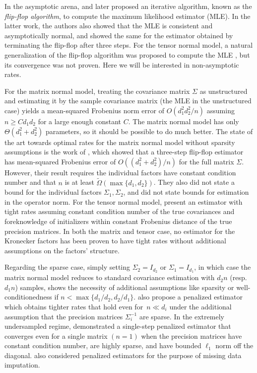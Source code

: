 \documentclass[aos]{imsart}
\theoremstyle{definition}
\numberwithin{equation}{section}
\begin{document}
In the asymptotic arena, \cite{dutilleul1999mle} and later \cite{werner2008estimation} proposed an iterative algorithm, known as the \emph{flip-flop algorithm}, to compute the maximum likelihood estimator (MLE).
In the latter work, the authors also showed that the MLE is consistent and asymptotically normal, and showed the same for the estimator obtained by terminating the flip-flop after three steps. For the tensor normal model, a natural generalization of the flip-flop algorithm was proposed to compute the MLE \citep{mardia1993spatial,manceur2013maximum}, but its convergence was not proven. Here we will be interested in non-asymptotic rates.

For the matrix normal model, treating the covariance matrix $\Sigma$ as unstructured and estimating it by the sample covariance matrix (the MLE in the unstructured case) yields a mean-squared Frobenius norm error of $O(d_1^2 d_2^2/n)$ assuming $n \geq C d_1 d_2$ for a large enough constant $C$.
The matrix normal model has only $\Theta(d_1^2 + d_2^2)$ parameters, so it should be possible to do much better. The state of the art towards optimal rates for the matrix normal model without sparsity assumptions is the work of \cite{tsiligkaridis2013convergence}, which showed that a three-step flip-flop estimator has mean-squared Frobenius error of $O((d_1^2 + d_2^2)/n)$ for the full matrix $\Sigma$. However, their result requires the individual factors have constant condition number and that $n$ is at least $\tilde{\Omega}(\max\{d_1,d_2\})$. They also did not state a bound for the individual factors $\Sigma_1, \Sigma_2$, and did not state bounds for estimation in the operator norm. For the tensor normal model, \cite{sun2015nonconvex} present an estimator with tight rates assuming constant condition number of the true covariances and foreknowledge of initializers within constant Frobenius distance of the true precision matrices. In both the matrix and tensor case, no estimator for the Kronecker factors has been proven to have tight rates without additional assumptions on the factors' structure.



Regarding the sparse case, simply setting $\Sigma_2 = I_{d_2}$ or $\Sigma_1 = I_{d_1}$, in which case the matrix normal model reduces to standard covariance estimation with $d_2 n$ (resp.\ $d_1 n$) samples, shows the necessity of additional assumptions like sparsity or well-conditionedness if $n < \max\{d_1/d_2, d_2/d_1\}$. \cite{tsiligkaridis2013convergence} also propose a penalized estimator which obtains tighter rates that hold even for~$n\ll d_i$ under the additional assumption that the precision matrices $\Sigma_i^{-1}$ are sparse. In the extremely undersampled regime, \cite{zhou2014gemini} demonstrated a single-step penalized estimator that converges even for a single matrix $(n=1)$ when the precision matrices have constant condition number, are highly sparse, and have bounded $\ell_1$ norm off the diagonal.
\cite{allen2010transposable} also considered penalized estimators for the purpose of missing data imputation.
\end{document}
